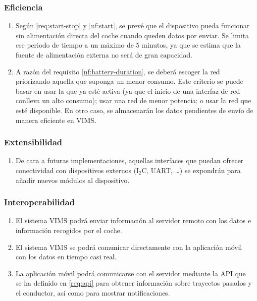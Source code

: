 \subsubsection{Eficiencia}
\begin{enumerate}[resume, label=\textbf{\texttt{RNF-\arabic*}}]
  \item\label{nf:battery-duration} Según \ref{req:start-stop} y \ref{nf:start},
  se prevé que el dispositivo pueda funcionar sin alimentación directa del coche
  cuando queden datos por enviar. Se limita ese periodo de tiempo a un máximo de
  5 minutos, ya que se estima que la fuente de alimentación externa no será de
  gran capacidad.
  \item\label{nf:network-election} A razón del requisito \ref{nf:battery-duration},
  se deberá escoger la red priorizando aquella que suponga un menor consumo. Este
  criterio se puede basar en usar la que ya esté activa (ya que el inicio de una
  interfaz de red conlleva un alto consumo); usar una red de menor potencia; o
  usar la red que esté disponible. En otro caso, se almacenarán los datos pendientes
  de envío de manera eficiente en \ac{VIMS}.
\end{enumerate}

\subsubsection{Extensibilidad}
\begin{enumerate}[resume, label=\textbf{\texttt{RNF-\arabic*}}]
  \item\label{nf:components} De cara a futuras implementaciones, aquellas interfaces
  que puedan ofrecer conectividad con dispositivos externos (I$_2$C, UART, \dots)
  se expondrán para añadir nuevos módulos al dispositivo.
\end{enumerate}

\subsubsection{Interoperabilidad}
\begin{enumerate}[resume, label=\textbf{\texttt{RNF-\arabic*}}]
  \item\label{nf:s2server} El sistema \ac{VIMS} podrá enviar información al servidor
  remoto con los datos e información recogidos por el coche.
  \item\label{nf:s2a} El sistema \ac{VIMS} se podrá comunicar directamente con la
  aplicación móvil con los datos en tiempo casi real.
  \item\label{nf:a2server} La aplicación móvil podrá comunicarse con el servidor
  mediante la \ac{API} que se ha definido en \ref{req:api} para obtener información
  sobre trayectos pasados y el conductor, así como para mostrar notificaciones.
\end{enumerate}

